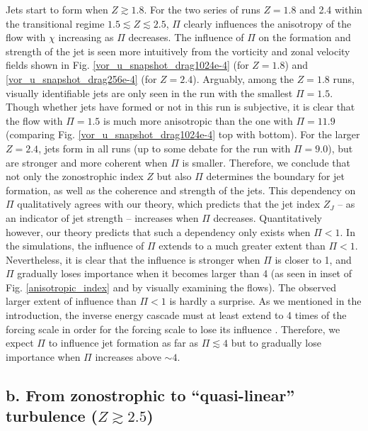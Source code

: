 \documentclass{ametsoc}
\begin{document}
Jets start to form when $Z\apprge1.8$. For the two series of runs
$Z=1.8$ and 2.4 within the transitional regime $1.5\apprle Z\apprle2.5$,
$\Pi$ clearly influences the anisotropy of the flow with $\chi$ increasing
as $\Pi$ decreases. The influence of $\Pi$ on the formation and
strength of the jet is seen more intuitively from the vorticity and zonal
velocity fields shown in Fig. \ref{vor_u_snapshot_drag1024e-4} (for
$Z=1.8$) and \ref{vor_u_snapshot_drag256e-4} (for $Z=2.4$). Arguably,
among the $Z=1.8$ runs, visually identifiable jets are only seen in the
run with the smallest $\Pi=1.5$. Though whether jets have formed
or not in this run is subjective, it is clear that the flow with $\Pi=1.5$
is much more anisotropic than the one with $\Pi=11.9$ (comparing
Fig. \ref{vor_u_snapshot_drag1024e-4} top with bottom). For the larger
$Z=2.4$, jets form in all runs (up to some debate for the run with
$\Pi=9.0$), but are stronger and more coherent when $\Pi$ is
smaller. Therefore, we conclude that not only the zonostrophic index
$Z$ but also $\Pi$ determines the boundary for jet formation, as
well as the coherence and strength of the jets. This dependency on
$\Pi$ qualitatively agrees with our theory, which predicts that the
jet index $Z_{J}$ -- as an indicator of jet strength -- increases
when $\Pi$ decreases. Quantitatively however, our theory predicts that
such a dependency only exists when $\Pi<1$. In the simulations, the
influence of $\Pi$ extends to a much greater extent than $\Pi<1$.
Nevertheless, it is clear that the influence is stronger
when $\Pi$ is closer to 1, and $\Pi$ gradually loses importance
when it becomes larger than 4 (as seen in inset of Fig. \ref{anisotropic_index}
and by visually examining the flows).
The observed larger extent of influence than $\Pi<1$ is hardly a
surprise. As we mentioned in the introduction, the inverse energy cascade
must at least extend to 4 times of the forcing scale in order for
the forcing scale to lose its influence \citep{Chen2006}. Therefore,
we expect $\Pi$ to influence jet formation as far as $\Pi\apprle4$
but to gradually lose importance when $\Pi$ increases above $\sim 4$.


\subsection*{b. From zonostrophic to ``quasi-linear'' turbulence ($Z\apprge2.5$)}
\end{document}
